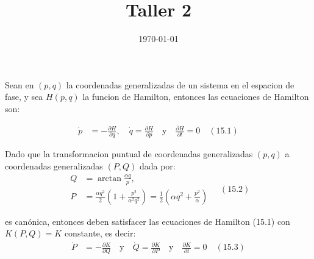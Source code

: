 \documentclass[a4paper]{article}
\date{\today}
\title{Taller 2}
\begin{document}
    \header{}

    
    \begin{answer}[Problema 1]
       Sean en  $(p,q)$ la coordenadas generalizadas de un sistema en el espacion de fase, y sea $H(p,q)$ la funcion de Hamilton, entonces las ecuaciones de Hamilton son:
        
        \begin{align*}
            \dot p &= -\frac{\partial H}{\partial q}, \quad \dot q = \frac{\partial H}{\partial p} \quad \text{y} \quad  \frac{\partial H}{\partial t} =0  \quad (15.1)
        \end{align*}

        Dado que la transformacion puntual de coordenadas generalizadas $(p,q)$ a coordenadas generalizadas $(P,Q)$ dada por:
        \begin{equation*}
            \begin{align*}  
                Q&=\arctan \frac{\alpha q}{p}, \\
                P&=\frac{\alpha q^2}{2}\left(1+\frac{p^2}{\alpha^2 q^2}\right) = \frac{1}{2}\left(\alpha q^2 + \frac{p^2}{\alpha} \right)
            \end{align*} \quad (15.2)
        \end{equation*}
      
        es canónica, entonces deben satisfacer las ecuaciones de Hamilton (15.1) con $K(P,Q) = K$ constante, es decir:
        \begin{align*}
            \dot P &= -\frac{\partial K}{\partial Q} \quad \text{y} \quad \dot Q = \frac{\partial K}{\partial P}  \quad \text{y} \quad \frac{\partial K}{\partial t} =0  \quad (15.3)
        \end{align*}


\end{answer}
\end{document}
